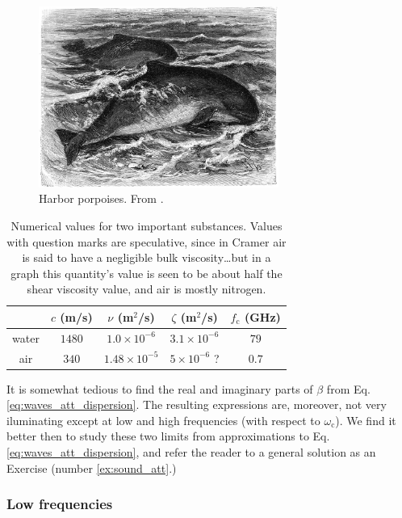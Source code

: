 \begin{figure}
  \begin{center}
    \includegraphics[width=0.7\textwidth]{figures/porpoises}
  \end{center}
  \caption{Harbor porpoises. From \cite{Brehms_Tierleben}.  \label{fig:porpoises}}
\end{figure}


\begin{table}
\begin{tabular}{|c|c|c|c|c|}
  \hline
    & $ c$ (m/s) &  $ \nu$ (m$^2$/s) & $\zeta$ (m$^2$/s) & $ f_\mathrm{c}$ (GHz)\\
  \hline
  \hline
  water & $1480$& $ 1.0 \times 10^{-6}$ & $ 3.1 \times 10^{-6}$ & $79$ \\
  \hline
  air & $340$   & $ 1.48\times 10^{-5}$ & $ 5 \times 10^{-6}$ ? & $0.7$ \\
  \hline
\end{tabular}
\caption{Numerical values for two important substances. Values with
  question marks are speculative, since in Cramer\cite{Cramer} air is
  said to have a negligible bulk viscosity\ldots but in a graph this
  quantity's value is seen to be about half the shear viscosity value,
  and air is mostly nitrogen.
 \label{tbl:sound_att}}
\end{table}

It is somewhat tedious to find the real and imaginary parts of $\beta$
from Eq. \ref{eq:waves_att_dispersion}. The resulting expressions are,
moreover, not very iluminating except at low and high frequencies
(with respect to $\omega_\mathrm{c}$). We find it better then to study
these two limits from approximations to
Eq. \ref{eq:waves_att_dispersion}, and refer the reader to a general
solution as an Exercise (number \ref{ex:sound_att}.)

\subsubsection{Low frequencies}


